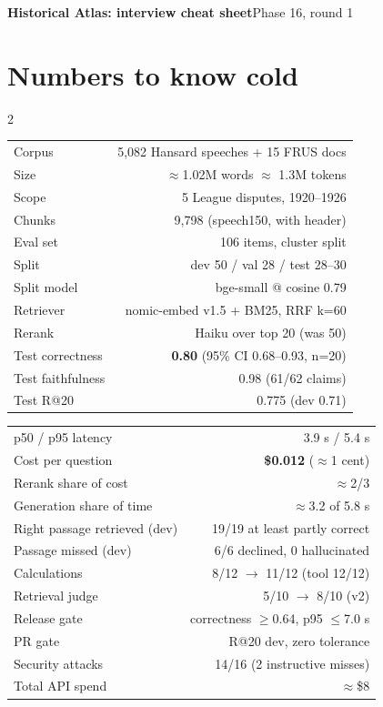 \documentclass[10pt,a4paper]{article}
\begin{document}
{\large\bfseries Historical Atlas: interview cheat sheet}\hfill{\small Phase 16, round 1}

\section{Numbers to know cold}
\begin{multicols}{2}
\small
\begin{tabularx}{\linewidth}{@{}Xr@{}}
\toprule
Corpus & 5,082 Hansard speeches + 15 FRUS docs \\
Size & $\approx$1.02M words $\approx$ 1.3M tokens \\
Scope & 5 League disputes, 1920--1926 \\
Chunks & 9,798 (speech150, with header) \\
Eval set & 106 items, cluster split \\
Split & dev 50 / val 28 / test 28--30 \\
Split model & bge-small @ cosine 0.79 \\
Retriever & nomic-embed v1.5 + BM25, RRF k=60 \\
Rerank & Haiku over top 20 (was 50) \\
\midrule
Test correctness & \textbf{0.80} (95\% CI 0.68--0.93, n=20) \\
Test faithfulness & 0.98 (61/62 claims) \\
Test R@20 & 0.775 (dev 0.71) \\
\bottomrule
\end{tabularx}

\begin{tabularx}{\linewidth}{@{}Xr@{}}
\toprule
p50 / p95 latency & 3.9 s / 5.4 s \\
Cost per question & \textbf{\$0.012} ($\approx$1 cent) \\
Rerank share of cost & $\approx$2/3 \\
Generation share of time & $\approx$3.2 of 5.8 s \\
Right passage retrieved (dev) & 19/19 at least partly correct \\
Passage missed (dev) & 6/6 declined, 0 hallucinated \\
Calculations & 8/12 $\to$ 11/12 (tool 12/12) \\
Retrieval judge & 5/10 $\to$ 8/10 (v2) \\
Release gate & correctness $\geq$0.64, p95 $\leq$7.0 s \\
PR gate & R@20 dev, zero tolerance \\
Security attacks & 14/16 (2 instructive misses) \\
Total API spend & $\approx$\$8 \\
\bottomrule
\end{tabularx}
\end{multicols}
\end{document}
